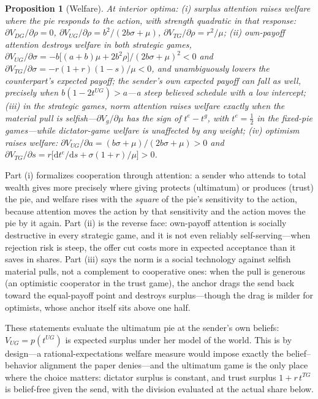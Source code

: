 \documentclass[11pt]{article}
\theoremstyle{plain}
\newtheorem{proposition}{Proposition}
\theoremstyle{remark}
\begin{document}
\begin{proposition}[Welfare]
\label{prop:welfare}
At interior optima: (i) surplus attention raises welfare where the pie responds to the action, with strength quadratic in that response: $\partial V_{DG}/\partial\rho=0$, $\partial V_{UG}/\partial\rho=b^{2}/(2b\sigma+\mu)$, $\partial V_{TG}/\partial\rho=r^{2}/\mu$; (ii) own-payoff attention destroys welfare in both strategic games, $\partial V_{UG}/\partial\sigma=-b\bigl[(a+b)\mu+2b^{2}\rho\bigr]/(2b\sigma+\mu)^{2}<0$ and $\partial V_{TG}/\partial\sigma=-r(1+r)(1-s)/\mu<0$, and unambiguously lowers the counterpart's expected payoff; the sender's own expected payoff can fall as well, precisely when $b(1-2t^{UG})>a$---a steep believed schedule with a low intercept; (iii) in the strategic games, norm attention raises welfare exactly when the material pull is selfish---$\partial V_{g}/\partial\mu$ has the sign of $t^{e}-t^{g}$, with $t^{e}=\tfrac12$ in the fixed-pie games---while dictator-game welfare is unaffected by any weight; (iv) optimism raises welfare: $\partial V_{UG}/\partial a=(b\sigma+\mu)/(2b\sigma+\mu)>0$ and $\partial V_{TG}/\partial s=r\bigl[\mathrm{d}t^{e}/\mathrm{d}s+\sigma(1+r)/\mu\bigr]>0$.
\end{proposition}

Part (i) formalizes cooperation through attention: a sender who attends to total wealth gives more precisely where giving protects (ultimatum) or produces (trust) the pie, and welfare rises with the \emph{square} of the pie's sensitivity to the action, because attention moves the action by that sensitivity and the action moves the pie by it again. Part (ii) is the reverse face: own-payoff attention is socially destructive in every strategic game, and it is not even reliably self-serving---when rejection risk is steep, the offer cut costs more in expected acceptance than it saves in shares. Part (iii) says the norm is a social technology against selfish material pulls, not a complement to cooperative ones: when the pull is generous (an optimistic cooperator in the trust game), the anchor drags the send back toward the equal-payoff point and destroys surplus---though the drag is milder for optimists, whose anchor itself sits above one half.

These statements evaluate the ultimatum pie at the sender's own beliefs: $V_{UG}=p(t^{UG})$ is expected surplus under her model of the world. This is by design---a rational-expectations welfare measure would impose exactly the belief--behavior alignment the paper denies---and the ultimatum game is the only place where the choice matters: dictator surplus is constant, and trust surplus $1+r\,t^{TG}$ is belief-free given the send, with the division evaluated at the actual share below.
\end{document}
